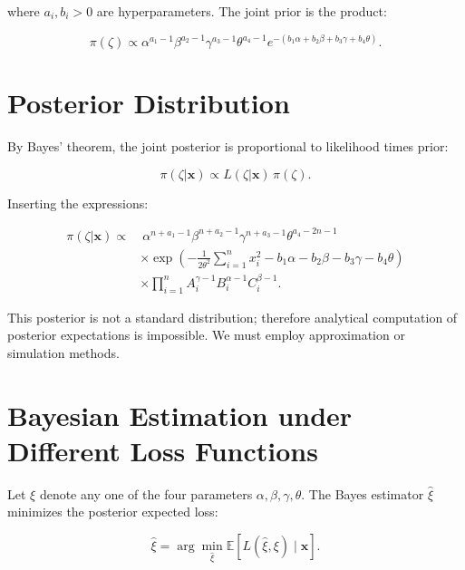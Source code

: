 \documentclass[12pt]{article}
\begin{document}
where \(a_i,b_i>0\) are hyperparameters. The joint prior is the product:



\[
\pi(\zeta) \propto \alpha^{a_1-1}\beta^{a_2-1}\gamma^{a_3-1}\theta^{a_4-1}
e^{-(b_1\alpha+b_2\beta+b_3\gamma+b_4\theta)}.
\]



\section{Posterior Distribution}



By Bayes' theorem, the joint posterior is proportional to likelihood times prior:



\[
\pi(\zeta|\mathbf{x}) \propto L(\zeta|\mathbf{x})\,\pi(\zeta).
\]



Inserting the expressions:



\[
\begin{aligned}
\pi(\zeta|\mathbf{x}) \propto &\ \alpha^{n+a_1-1}\beta^{n+a_2-1}\gamma^{n+a_3-1}\theta^{a_4-2n-1} \\
&\times \exp\left(-\frac{1}{2\theta^2}\sum_{i=1}^{n}x_i^2
- b_1\alpha - b_2\beta - b_3\gamma - b_4\theta\right) \\
&\times \prod_{i=1}^{n} A_i^{\gamma-1} B_i^{\alpha-1} C_i^{\beta-1}.
\end{aligned}
\label{eq:posterior}
\]



This posterior is not a standard distribution; therefore analytical computation
of posterior expectations is impossible. We must employ approximation or
simulation methods.



\section{Bayesian Estimation under Different Loss Functions}



Let \(\xi\) denote any one of the four parameters \(\alpha,\beta,\gamma,\theta\).
The Bayes estimator \(\hat{\xi}\) minimizes the posterior expected loss:



\[
\hat{\xi} = \arg\min_{\hat{\xi}} \mathbb{E}\left[ L(\hat{\xi},\xi) \mid \mathbf{x} \right].
\]
\end{document}
